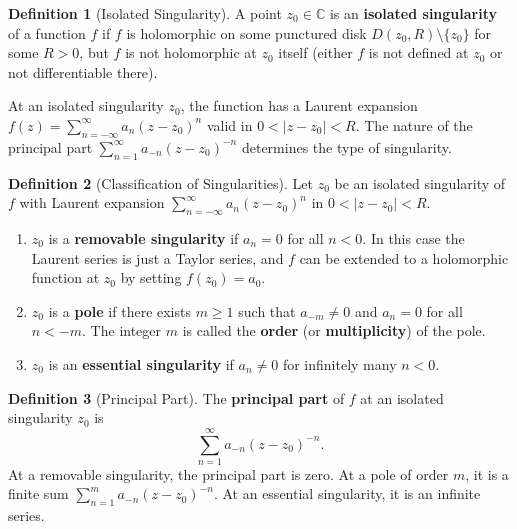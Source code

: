 \documentclass[12pt,a4paper,openany]{book}
\theoremstyle{definition}
\newtheorem{definition}{Definition}[chapter]
\theoremstyle{plain}
\theoremstyle{remark}
\newcommand{\C}{\mathbb{C}}
\newcommand{\abs}[1]{\left|#1\right|}
\begin{document}
\begin{definition}[Isolated Singularity]\label{def:isolated-singularity}
A point $z_0\in\C$ is an \textbf{isolated singularity} of a function $f$ if
$f$ is holomorphic on some punctured disk $D(z_0,R)\setminus\{z_0\}$ for some
$R>0$, but $f$ is not holomorphic at $z_0$ itself (either $f$ is not defined at
$z_0$ or not differentiable there).
\end{definition}

At an isolated singularity $z_0$, the function has a Laurent expansion
$f(z)=\sum_{n=-\infty}^{\infty}a_n(z-z_0)^n$ valid in $0<\abs{z-z_0}<R$. The
nature of the principal part $\sum_{n=1}^{\infty}a_{-n}(z-z_0)^{-n}$ determines
the type of singularity.

\begin{definition}[Classification of Singularities]\label{def:singularity-types}
Let $z_0$ be an isolated singularity of $f$ with Laurent expansion
$\sum_{n=-\infty}^{\infty}a_n(z-z_0)^n$ in $0<\abs{z-z_0}<R$.
\begin{enumerate}[label=(\roman*)]
  \item $z_0$ is a \textbf{removable singularity} if $a_n=0$ for all $n<0$.
    In this case the Laurent series is just a Taylor series, and $f$ can be
    extended to a holomorphic function at $z_0$ by setting $f(z_0)=a_0$.
  \item $z_0$ is a \textbf{pole} if there exists $m\ge 1$ such that $a_{-m}\ne 0$
    and $a_n=0$ for all $n<-m$. The integer $m$ is called the \textbf{order}
    (or \textbf{multiplicity}) of the pole.
  \item $z_0$ is an \textbf{essential singularity} if $a_n\ne 0$ for infinitely
    many $n<0$.
\end{enumerate}
\end{definition}

\begin{definition}[Principal Part]\label{def:principal-part}
The \textbf{principal part} of $f$ at an isolated singularity $z_0$ is
\[
  \sum_{n=1}^{\infty}a_{-n}(z-z_0)^{-n}.
\]
At a removable singularity, the principal part is zero. At a pole of order $m$,
it is a finite sum $\sum_{n=1}^{m}a_{-n}(z-z_0)^{-n}$. At an essential
singularity, it is an infinite series.
\end{definition}

\begin{center}
\end{center}
\end{document}
